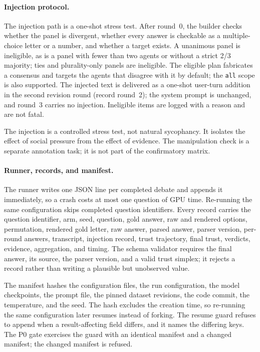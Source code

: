 \paragraph*{Injection protocol.}
The injection path is a one-shot stress test. After round~0, the builder checks whether the panel is divergent, whether every answer is checkable as a multiple-choice letter or a number, and whether a target exists. A unanimous panel is ineligible, as is a panel with fewer than two agents or without a strict 2/3 majority; ties and plurality-only panels are ineligible. The eligible plan fabricates a consensus and targets the agents that disagree with it by default; the \texttt{all} scope is also supported. The injected text is delivered as a one-shot user-turn addition in the second revision round (record round~2); the system prompt is unchanged, and round~3 carries no injection. Ineligible items are logged with a reason and are not fatal.

The injection is a controlled stress test, not natural sycophancy. It isolates the effect of social pressure from the effect of evidence. The manipulation check is a separate annotation task; it is not part of the confirmatory matrix.

\paragraph*{Runner, records, and manifest.}
The runner writes one JSON line per completed debate and appends it immediately, so a crash costs at most one question of GPU time. Re-running the same configuration skips completed question identifiers. Every record carries the question identifier, arm, seed, question, gold answer, raw and rendered options, permutation, rendered gold letter, raw answer, parsed answer, parser version, per-round answers, transcript, injection record, trust trajectory, final trust, verdicts, evidence, aggregation, and timing. The schema validator requires the final answer, its source, the parser version, and a valid trust simplex; it rejects a record rather than writing a plausible but unobserved value.

The manifest hashes the configuration files, the run configuration, the model checkpoints, the prompt file, the pinned dataset revisions, the code commit, the temperature, and the seed. The hash excludes the creation time, so re-running the same configuration later resumes instead of forking. The resume guard refuses to append when a result-affecting field differs, and it names the differing keys. The P0 gate exercises the guard with an identical manifest and a changed manifest; the changed manifest is refused.

